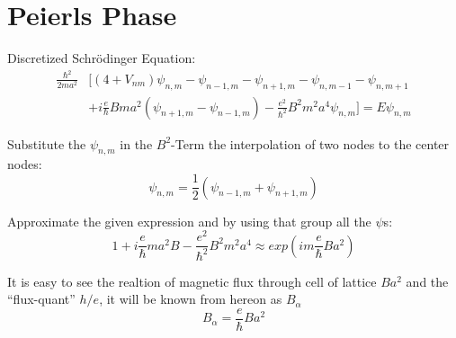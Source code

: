 
\author{Jonas Siegl}



\section{Peierls Phase}
Discretized Schr\"odinger Equation:
\begin{align}
	\frac{\hbar^2}{2ma^2} &[(4 +V_{nm}) \psi_{n,m} - \psi_{n-1,m} - \psi_{n+1,m} - \psi_{n,m-1} - \psi_{n,m+1} \nonumber \\
	&+i \frac{e}{\hbar} B m a^2 (\psi_{n+1,m} - \psi_{n-1,m}) - \frac{e^2}{\hbar^2} B^2 m^2 a^4 \psi_{n,m} ] = E \psi_{n,m}
\end{align}

Substitute the $\psi_{n,m}$ in the $B^2$-Term the interpolation of two nodes to the center nodes:
\begin{equation}
	\psi_{n,m} = \frac{1}{2} (\psi_{n-1,m} + \psi_{n+1,m})
	\label{interpolate_psi}
\end{equation}

Approximate the given expression and by using that group all the $\psi$s:
\begin{equation}
	1 + i \frac{e}{\hbar} m a^2 B - \frac{e^2}{\hbar^2} B^2 m^2 a^4 \approx exp(i m \frac{e}{\hbar} B a^2)
	\label{approx_exp}
\end{equation}

It is easy to see the realtion of magnetic flux through cell of lattice $Ba^2$ and the ``flux-quant'' $h / e$, 
it will be known from hereon as $B_{\alpha}$
\begin{equation}
	B_{\alpha} = \frac{e}{\hbar} B  a^2
	\label{Balpha}
\end{equation}

